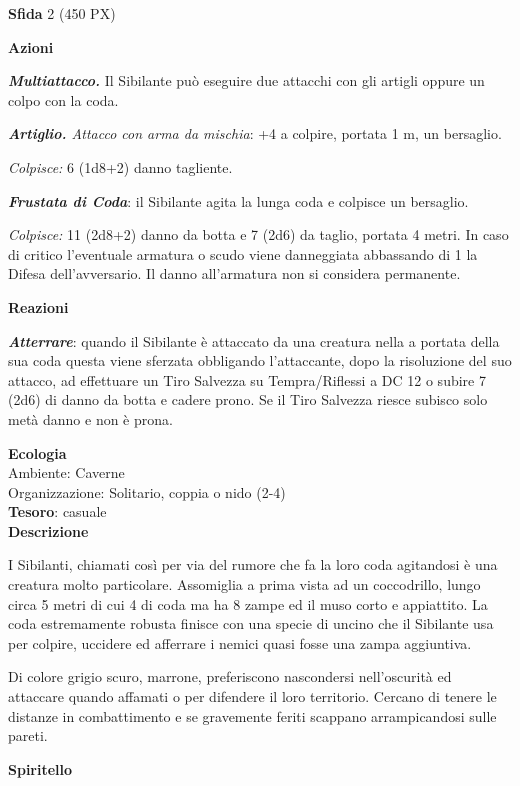 \begin{multicols}{2}
	\textbf{Sfida} 2 (450 PX)

	\textbf{Azioni}

	\textit{\textbf{Multiattacco.}} Il Sibilante può eseguire due attacchi con gli artigli oppure un colpo con la coda.

	\textit{\textbf{Artiglio.} Attacco con arma da mischia}: +4 a colpire, portata 1 m, un bersaglio.

	\textit{Colpisce:} 6 (1d8+2) danno tagliente.

	\textit{\textbf{Frustata di Coda}}: il Sibilante agita la lunga coda e colpisce un bersaglio.

	\textit{Colpisce:} 11 (2d8+2) danno da botta e 7 (2d6) da taglio, portata 4 metri. In caso di critico l'eventuale armatura o scudo viene danneggiata abbassando di 1 la Difesa dell'avversario. Il danno all'armatura non si considera permanente.

	\textbf{Reazioni}

	\textit{\textbf{Atterrare}}: quando il Sibilante è attaccato da una creatura nella a portata della sua coda questa viene sferzata obbligando l'attaccante, dopo la risoluzione del suo attacco, ad effettuare un Tiro Salvezza su Tempra/Riflessi a DC 12 o subire 7 (2d6) di danno da botta e cadere prono. Se il Tiro Salvezza riesce subisco solo metà danno e non è prona.

	\textbf{Ecologia}\\
	Ambiente: Caverne\\
	Organizzazione: Solitario, coppia o nido (2-4)\\
	\textbf{Tesoro}: casuale\\

	\textbf{Descrizione}

	I Sibilanti, chiamati così per via del rumore che fa la loro coda agitandosi è una creatura molto particolare. Assomiglia a prima vista ad un coccodrillo, lungo circa 5 metri di cui 4 di coda ma ha 8 zampe ed il muso corto e appiattito. La coda estremamente robusta finisce con una specie di uncino che il Sibilante usa per colpire, uccidere ed afferrare i nemici quasi fosse una zampa aggiuntiva.

	Di colore grigio scuro, marrone, preferiscono nascondersi nell'oscurità ed attaccare quando affamati o per difendere il loro territorio. Cercano di tenere le distanze in combattimento e se gravemente feriti scappano arrampicandosi sulle pareti.


	\medskip{}\textbf{Spiritello}


\end{multicols}
